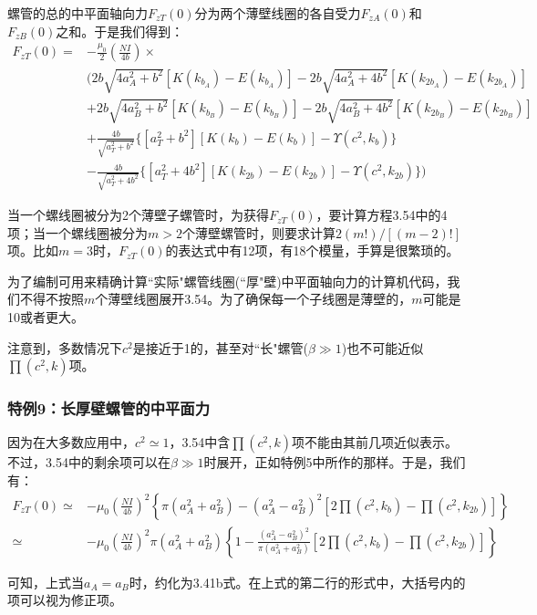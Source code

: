 螺管的总的中平面轴向力$F_{zT}(0)$分为两个薄壁线圈的各自受力$F_{zA}(0)$和$F_{zB}(0)$之和。于是我们得到：
\begin{equation}
\begin{split}
F_{zT}(0)=&-\frac{\mu_0}{2}(\frac{N I}{4b})\times \\
&\bigg(2b\sqrt{4a_A^2+b^2}[K(k_{b_A})-E(k_{b_A})]-2b\sqrt{4a_A^2+4b^2}[K(k_{2b_A})-E(k_{2b_A})]\\
&+2b\sqrt{4a_B^2+b^2}[K(k_{b_B})-E(k_{b_B})]-2b\sqrt{4a_B^2+4b^2}[K(k_{2b_B})-E(k_{2b_B})]\\
&+\frac{4b}{\sqrt{a_T^2+b^2}} \{[a_T^2+b^2][K(k_{b})-E(k_{b})]-\Upsilon(c^2,k_b)\}\\
&-\frac{4b}{\sqrt{a_T^2+4b^2}} \{[a_T^2+4b^2][K(k_{2b})-E(k_{2b})]-\Upsilon(c^2,k_{2b}) \}\bigg)
\end{split}
\end{equation}

当一个螺线圈被分为2个薄壁子螺管时，为获得$F_{zT}(0)$，要计算方程3.54中的4项；当一个螺线圈被分为$m>2$个薄壁螺管时，则要求计算$2(m!)/[(m−2)!]$项。比如$m=3$时，$F_{zT}(0)$的表达式中有12项，有18个模量，手算是很繁琐的。

为了编制可用来精确计算``实际"螺管线圈(``厚"壁)中平面轴向力的计算机代码，我们不得不按照$m$个薄壁线圈展开3.54。为了确保每一个子线圈是薄壁的，$m$可能是10或者更大。

注意到，多数情况下$c^2$是接近于1的，甚至对``长"螺管($\beta\gg 1$)也不可能近似$\prod(c^2,k)$项。

\subsubsection{特例9：长厚壁螺管的中平面力}
因为在大多数应用中，$c^2\simeq 1$，3.54中含$\prod{(c^2,k)}$项不能由其前几项近似表示。不过，3.54中的剩余项可以在$\beta \gg 1$时展开，正如特例5中所作的那样。于是，我们有：
\begin{equation}
\begin{split}
F_{zT}(0)\simeq& -\mu_0 (\frac{N I}{4b})^2\left\{ \pi(a_A^2+a_B^2)-(a_A^2-a_B^2)^2[2\prod(c^2,k_b)-\prod(c^2,k_{2b})]\right\}  \\
\simeq& -\mu_0 (\frac{N I}{4b})^2 \pi(a_A^2+a_B^2) \left\{1-\frac{(a_A^2-a_B^2)^2}{\pi(a_A^2+a_B^2)}[2\prod(c^2,k_b)-\prod(c^2,k_{2b})]\right\}
\end{split}
\end{equation}

可知，上式当$a_A=a_B$时，约化为3.41b式。在上式的第二行的形式中，大括号内的项可以视为修正项。

